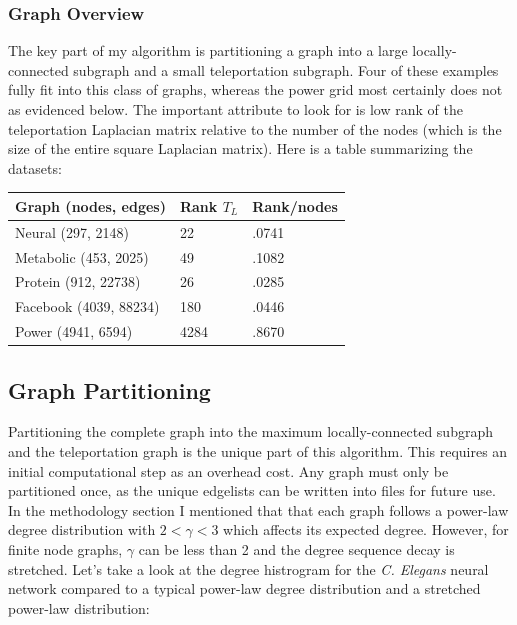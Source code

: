\documentclass{article}
\begin{document}
\subsubsection{Graph Overview}
The key part of my algorithm is partitioning a graph into a large locally-connected subgraph and a small teleportation subgraph. Four of these examples fully fit into this class of graphs, whereas the power grid most certainly does not as evidenced below. The important attribute to look for is low rank of the teleportation Laplacian matrix relative to the number of the nodes (which is the size of the entire square Laplacian matrix). Here is a table summarizing the datasets:

\begin{spacing}{1}
\begin{center}
\renewcommand{\arraystretch}{1.5}
    \begin{tabular}{| l | l | l |}
    \hline
    Graph (nodes, edges) & Rank $T_L$ & Rank/nodes \\ \hline
    Neural (297, 2148) & 22 & .0741 \\ \hline
    Metabolic (453, 2025) & 49 & .1082 \\  \hline
    Protein (912, 22738) & 26 & .0285 \\ \hline
    Facebook (4039, 88234) & 180 & .0446 \\ \hline
    Power (4941, 6594) & 4284 & .8670 \\ 
    \hline
    \end{tabular}
\end{center}
\end{spacing}

\subsection{Graph Partitioning}
Partitioning the complete graph into the maximum locally-connected subgraph and the teleportation graph is the unique part of this algorithm. This requires an initial computational step as an overhead cost. Any graph must only be partitioned once, as the unique edgelists can be written into files for future use. In the methodology section I mentioned that that each graph follows a power-law degree distribution with $2 < \gamma < 3$ which affects its expected degree. However, for finite node graphs, $\gamma$ can be less than 2 and the degree sequence decay is stretched. Let's take a look at the degree histrogram for the \textit{C. Elegans} neural network compared to a typical power-law degree distribution and a stretched power-law distribution:
\end{document}
